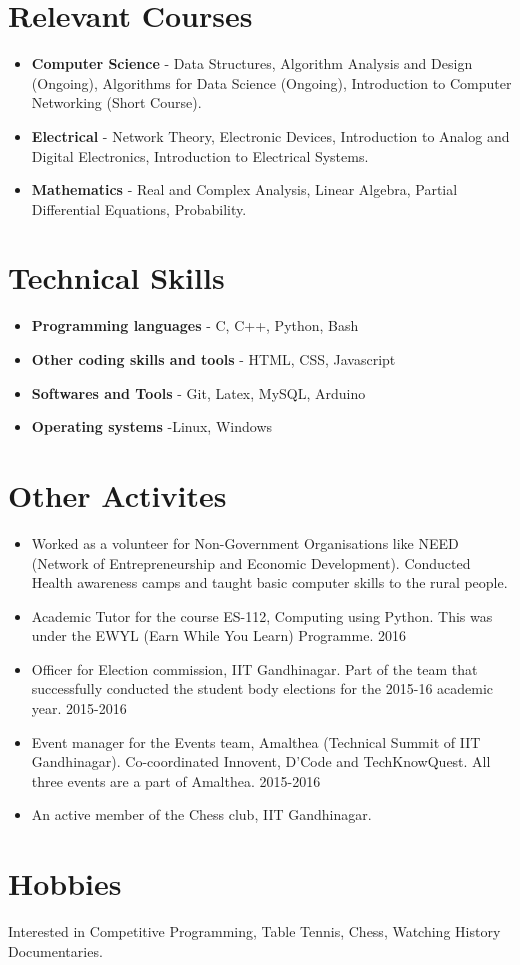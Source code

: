 \documentclass[margin, centered]{res}
\begin{document}
\begin{resume}
\section{Relevant Courses}
\begin{itemize}[leftmargin=*]
\item {\bf Computer Science} - Data Structures, Algorithm Analysis and Design (Ongoing), Algorithms for Data Science (Ongoing), Introduction to Computer Networking (Short Course).
\item {\bf Electrical} - Network Theory, Electronic Devices, Introduction to Analog and Digital Electronics, Introduction to Electrical Systems.
\item {\bf Mathematics} - Real and Complex Analysis, Linear Algebra, Partial Differential Equations, Probability.
\end{itemize}

\section{Technical Skills}
\begin{itemize}[leftmargin=*]
\item {\bf Programming languages} - C, C++, Python, Bash
\item {\bf Other coding skills and tools} - HTML, CSS, Javascript
\item {\bf Softwares and Tools} - Git, Latex, MySQL, Arduino
\item {\bf Operating systems} -Linux, Windows
\end{itemize}

\section{Other Activites}
\begin{itemize}[leftmargin=*]
\item Worked as a volunteer for Non-Government Organisations like NEED (Network of Entrepreneurship and Economic Development). Conducted Health awareness camps and taught basic computer skills to the rural people.
\item Academic Tutor for the course ES-112, Computing using Python. This was under the EWYL (Earn While You Learn) Programme. 
\hfill {2016}
\item Officer for Election commission, IIT Gandhinagar. Part of the team that successfully conducted the student body elections for the 2015-16 academic year.
\hfill{2015-2016}
\item Event manager for the Events team, Amalthea (Technical Summit of IIT Gandhinagar). Co-coordinated Innovent, D’Code and TechKnowQuest. All three events are a part of Amalthea.
\hfill{2015-2016}
\item An active member of the Chess club, IIT Gandhinagar.
\end{itemize}

\section{Hobbies}Interested in Competitive Programming, Table Tennis, Chess, Watching History Documentaries.

\end{resume}
\end{document}
